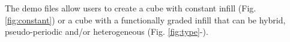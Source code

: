 The demo files allow users to create a cube with constant infill (Fig. \ref{fig:constant}) or a cube with a functionally graded infill that can be hybrid, pseudo-periodic and/or heterogeneous (Fig. \ref{fig:type}-).
\begin{figure}[htb]
\end{figure}
